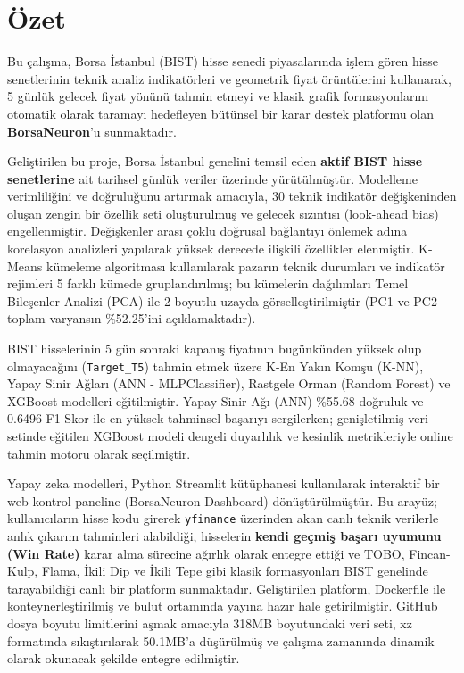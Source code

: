 \documentclass[12pt,a4paper]{report}
\begin{document}
\chapter*{Özet}
Bu çalışma, Borsa İstanbul (BIST) hisse senedi piyasalarında işlem gören hisse senetlerinin teknik analiz indikatörleri ve geometrik fiyat örüntülerini kullanarak, 5 günlük gelecek fiyat yönünü tahmin etmeyi ve klasik grafik formasyonlarını otomatik olarak taramayı hedefleyen bütünsel bir karar destek platformu olan \textbf{BorsaNeuron}'u sunmaktadır. 

Geliştirilen bu proje, Borsa İstanbul genelini temsil eden \textbf{aktif BIST hisse senetlerine} ait tarihsel günlük veriler üzerinde yürütülmüştür. Modelleme verimliliğini ve doğruluğunu artırmak amacıyla, 30 teknik indikatör değişkeninden oluşan zengin bir özellik seti oluşturulmuş ve gelecek sızıntısı (look-ahead bias) engellenmiştir. Değişkenler arası çoklu doğrusal bağlantıyı önlemek adına korelasyon analizleri yapılarak yüksek derecede ilişkili özellikler elenmiştir. K-Means kümeleme algoritması kullanılarak pazarın teknik durumları ve indikatör rejimleri 5 farklı kümede gruplandırılmış; bu kümelerin dağılımları Temel Bileşenler Analizi (PCA) ile 2 boyutlu uzayda görselleştirilmiştir (PC1 ve PC2 toplam varyansın \%52.25'ini açıklamaktadır).

BIST hisselerinin 5 gün sonraki kapanış fiyatının bugünkünden yüksek olup olmayacağını (\texttt{Target\_T5}) tahmin etmek üzere K-En Yakın Komşu (K-NN), Yapay Sinir Ağları (ANN - MLPClassifier), Rastgele Orman (Random Forest) ve XGBoost modelleri eğitilmiştir. Yapay Sinir Ağı (ANN) \%55.68 doğruluk ve 0.6496 F1-Skor ile en yüksek tahminsel başarıyı sergilerken; genişletilmiş veri setinde eğitilen XGBoost modeli dengeli duyarlılık ve kesinlik metrikleriyle online tahmin motoru olarak seçilmiştir.

Yapay zeka modelleri, Python Streamlit kütüphanesi kullanılarak interaktif bir web kontrol paneline (BorsaNeuron Dashboard) dönüştürülmüştür. Bu arayüz; kullanıcıların hisse kodu girerek \texttt{yfinance} üzerinden akan canlı teknik verilerle anlık çıkarım tahminleri alabildiği, hisselerin \textbf{kendi geçmiş başarı uyumunu (Win Rate)} karar alma sürecine ağırlık olarak entegre ettiği ve TOBO, Fincan-Kulp, Flama, İkili Dip ve İkili Tepe gibi klasik formasyonları BIST genelinde tarayabildiği canlı bir platform sunmaktadır. Geliştirilen platform, Dockerfile ile konteynerleştirilmiş ve bulut ortamında yayına hazır hale getirilmiştir. GitHub dosya boyutu limitlerini aşmak amacıyla 318MB boyutundaki veri seti, xz formatında sıkıştırılarak 50.1MB'a düşürülmüş ve çalışma zamanında dinamik olarak okunacak şekilde entegre edilmiştir.
\end{document}
